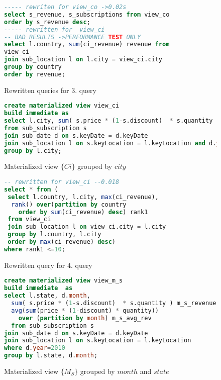 \begin{figure}[!htp]
\begin{lstlisting}[language=sql] 
----- rewriten for view_co ->0.02s
select s_revenue, s_subscriptions from view_co 
order by s_revenue desc;
----- rewritten for  view_ci 
-- BAD RESULTS ->PERFORMANCE TEST ONLY
select l.country, sum(ci_revenue) revenue from
view_ci
join sub_location l on l.city = view_ci.city
group by country
order by revenue;
\end{lstlisting}
\caption{\label{s:requery_3} Rewritten queries for $3$. query}
\end{figure}

\begin{figure}[!hbp]
\begin{lstlisting}[language=sql] 
create materialized view view_ci 
build immediate as
select l.city, sum( s.price * (1-s.discount)  * s.quantity ) ci_revenue  
from sub_subscription s
join sub_date d on s.keyDate = d.keyDate
join sub_location l on s.keyLocation = l.keyLocation and d.year=2010
group by l.city;
\end{lstlisting}
\caption{\label{s:view_ci} Materialized view $\{Ci\}$ grouped by $city$}
\end{figure}

\begin{figure}[!hbp]
\begin{lstlisting}[language=sql] 
-- rewritten for view_ci --0.018
select * from (
 select l.country, l.city, max(ci_revenue),  
  rank() over(partition by country 
    order by sum(ci_revenue) desc) rank1 
 from view_ci 
 join sub_location l on view_ci.city = l.city
 group by l.country, l.city
 order by max(ci_revenue) desc)
where rank1 <=10;
\end{lstlisting}
\caption{\label{s:requery_4} Rewritten query for $4$. query}
\end{figure}

\begin{figure}[!hbp]
\begin{lstlisting}[language=sql] 
create materialized view view_m_s 
build immediate  as
select l.state, d.month, 
  sum( s.price * (1-s.discount)  * s.quantity ) m_s_revenue,
  avg(sum(price * (1-discount) * quantity)) 
    over (partition by month) m_s_avg_rev
  from sub_subscription s
join sub_date d on s.keyDate = d.keyDate
join sub_location l on s.keyLocation = l.keyLocation
where d.year=2010
group by l.state, d.month; 
\end{lstlisting}
\caption{\label{s:view_m_s} Materialized view $\{M_S\}$ grouped by $month$ and $state$}
\end{figure}

